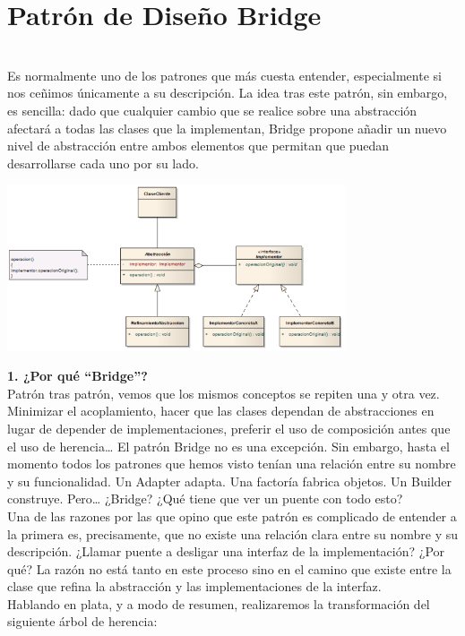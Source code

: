 \section{Patrón de Diseño Bridge} 
\textbf{}\\
Es normalmente uno de los patrones que más cuesta entender, especialmente si nos ceñimos únicamente a su descripción. La idea tras este patrón, sin embargo, es sencilla: dado que cualquier cambio que se realice sobre una abstracción afectará a todas las clases que la implementan, Bridge propone añadir un nuevo nivel de abstracción entre ambos elementos que permitan que puedan desarrollarse cada uno por su lado.
\begin{flushleft}
\begin{center}
	\includegraphics[width=10cm]{./Imagenes/bridge1} 
	\end{center}
\begin{itemize}


\textbf {1.	¿Por qué “Bridge”?}
\textbf{}\\
Patrón tras patrón, vemos que los mismos conceptos se repiten una y otra vez. Minimizar el acoplamiento, hacer que las clases dependan de abstracciones en lugar de depender de implementaciones, preferir el uso de composición antes que el uso de herencia… El patrón Bridge no es una excepción. Sin embargo, hasta el momento todos los patrones que hemos visto tenían una relación entre su nombre y su funcionalidad. Un Adapter adapta. Una factoría fabrica objetos. Un Builder construye. Pero… ¿Bridge? ¿Qué tiene que ver un puente con todo esto?
\textbf{}\\
Una de las razones por las que opino que este patrón es complicado de entender a la primera es, precisamente, que no existe una relación clara entre su nombre y su descripción. ¿Llamar puente a desligar una interfaz de la implementación? ¿Por qué? La razón no está tanto en este proceso sino en el camino que existe entre la clase que refina la abstracción y las implementaciones de la interfaz.
\textbf{}\\
Hablando en plata, y a modo de resumen, realizaremos la transformación del siguiente árbol de herencia:



\end{itemize}
\end{flushleft}
